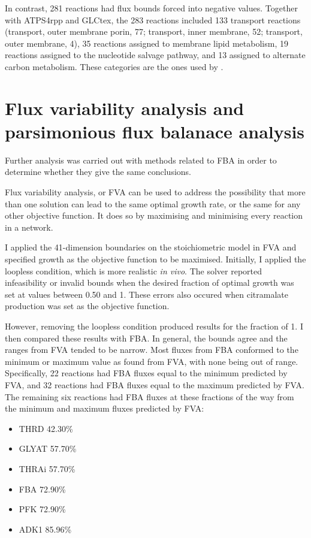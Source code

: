 \documentclass[parskip=full, numbers=noenddot]{scrreprt}
\begin{document}
  In contrast, 281 reactions had flux bounds forced into negative values. Together with ATPS4rpp and GLCtex, the 283 reactions included 133 transport reactions (transport, outer membrane porin, 77; transport, inner membrane, 52; transport, outer membrane, 4), 35 reactions assigned to membrane lipid metabolism, 19 reactions assigned to the nucleotide salvage pathway, and 13 assigned to alternate carbon metabolism. These categories are the ones used by \citet{orth_comprehensive_2011}.

  \section{Flux variability analysis and parsimonious flux balanace analysis}
  \label{sec:fva}

Further analysis was carried out with methods related to FBA in order to determine whether they give the same conclusions.

Flux variability analysis, or FVA \citep{orth_what_2010} can be used to address the possibility that more than one solution can lead to the same optimal growth rate, or the same for any other objective function. It does so by maximising and minimising every reaction in a network.

I applied the 41-dimension boundaries on the stoichiometric model in FVA and specified growth as the objective function to be maximised. Initially, I applied the loopless condition, which is more realistic \emph{in vivo}. The solver reported infeasibility or invalid bounds when the desired fraction of optimal growth was set at values between 0.50 and 1. These errors also occured when citramalate production was set as the objective function.

However, removing the loopless condition produced results for the fraction of 1.
I then compared these results with FBA. In general, the bounds agree and the ranges from FVA tended to be narrow. Most fluxes from FBA conformed to the minimum or maximum value as found from FVA, with none being out of range. Specifically, 22 reactions had FBA fluxes equal to the minimum predicted by FVA, and 32 reactions had FBA fluxes equal to the maximum predicted by FVA. The remaining six reactions had FBA fluxes at these fractions of the way from the minimum and maximum fluxes predicted by FVA:
\begin{itemize}
\item THRD 42.30\%
\item GLYAT 57.70\%
\item THRAi 57.70\%
\item FBA 72.90\%
\item PFK 72.90\%
  \item ADK1 85.96\%
  \end{itemize}
\end{document}
